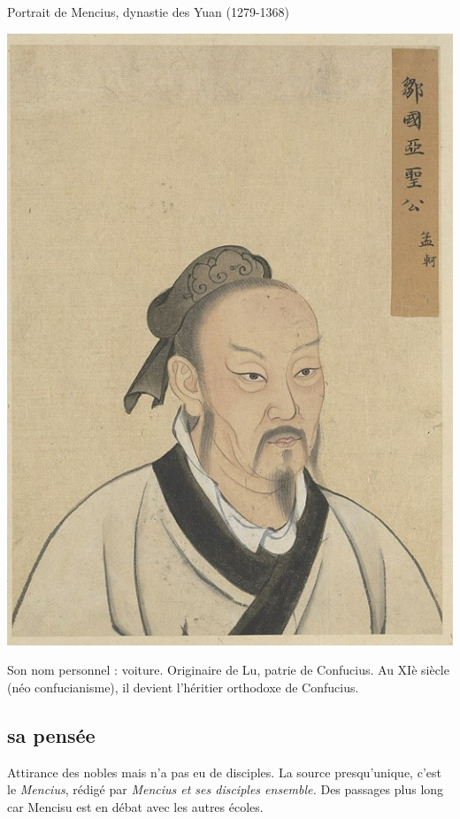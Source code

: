  \begin{marginfigure}
     \centering
          \caption{Portrait de Mencius, dynastie des Yuan (1279-1368)}
     \includegraphics[width=\textwidth]{ConfucianismeTaoismeBouddhismeChinois/Images/Mencius.jpg}

     \label{fig:enter-label}
 \end{marginfigure}
 Son nom personnel : voiture. Originaire de Lu, patrie de Confucius. Au XIè siècle (néo confucianisme), il devient l'héritier orthodoxe de Confucius.

\subsection{sa pensée}

Attirance des nobles mais n'a pas eu de disciples.
La source presqu'unique, c'est le \textit{Mencius}, rédigé par \textit{Mencius et ses disciples ensemble.} Des passages plus long car Mencisu est en débat avec les autres écoles. 

